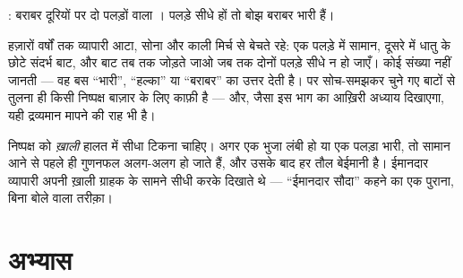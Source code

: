 \begin{omfigure}

{\small {}: बराबर दूरियों पर दो पलड़ों वाला । पलड़े सीधे
हों तो बोझ बराबर भारी हैं।}
\end{omfigure}

\begin{example}[तुलना करके तौलना]\label{ex:g3:levers-and-scales:weighing}
हज़ारों वर्षों तक व्यापारी आटा, सोना और काली मिर्च  से बेचते
रहे: एक पलड़े में सामान, दूसरे में धातु के छोटे संदर्भ बाट, और बाट
तब तक जोड़ते जाओ जब तक दोनों पलड़े सीधे न हो जाएँ।  कोई संख्या
नहीं जानती --- वह बस ``भारी'', ``हल्का'' या ``बराबर'' का उत्तर देती
है। पर सोच-समझकर चुने गए बाटों से तुलना ही किसी निष्पक्ष बाज़ार के
लिए काफ़ी है --- और, जैसा इस भाग का आख़िरी अध्याय दिखाएगा, यही
द्रव्यमान मापने की राह भी है।
\end{example}

\begin{remark}[ख़ाली तुला जाँच लो]\label{rem:g3:levers-and-scales:fair}
निष्पक्ष  को \emph{ख़ाली} हालत में सीधा टिकना चाहिए। अगर एक भुजा
लंबी हो या एक पलड़ा भारी, तो सामान आने से पहले ही गुणनफल अलग-अलग हो
जाते हैं, और उसके बाद हर तौल बेईमानी है। ईमानदार व्यापारी अपनी ख़ाली
 ग्राहक के सामने सीधी करके दिखाते थे --- ``ईमानदार सौदा'' कहने का
एक पुराना, बिना बोले वाला तरीक़ा।
\end{remark}

\section{अभ्यास}

